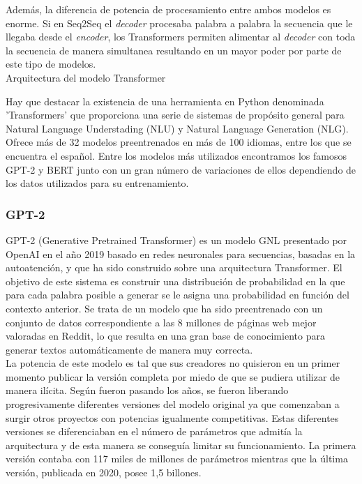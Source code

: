 Además, la diferencia de potencia de procesamiento entre ambos modelos es enorme. Si en Seq2Seq el \textit{decoder} procesaba palabra a palabra la secuencia que le llegaba desde el \textit{encoder}, los Transformers permiten alimentar al \textit{decoder} con toda la secuencia de manera simultanea resultando en un mayor poder por parte de este tipo de modelos.\\

%
{Arquitectura del modelo Transformer}

Hay que destacar la existencia de una herramienta en Python denominada 'Transformers' que proporciona una serie de sistemas de propósito general para Natural Language Understading (NLU) y Natural Language Generation (NLG). Ofrece más de 32 modelos preentrenados en más de 100 idiomas, entre los que se encuentra el español. Entre los modelos más utilizados encontramos los famosos GPT-2 y BERT junto con un gran número de variaciones de ellos dependiendo de los datos utilizados para su entrenamiento.\\

\subsubsection{GPT-2}
GPT-2 (Generative Pretrained Transformer) es un modelo GNL presentado por OpenAI en el año 2019 basado en redes neuronales para secuencias, basadas en la autoatención, y que ha sido construido sobre una arquitectura Transformer. El objetivo de este sistema es construir una distribución de probabilidad en la que para cada palabra posible a generar se le asigna una probabilidad en función del contexto anterior. Se trata de un modelo que ha sido preentrenado con un conjunto de datos correspondiente a las 8 millones de páginas web mejor valoradas en Reddit, lo que resulta en una gran base de conocimiento para generar textos automáticamente de manera muy correcta.\\

La potencia de este modelo es tal que sus creadores no quisieron en un primer momento publicar la versión completa por miedo de que se pudiera utilizar de manera ilícita. Según fueron pasando los años, se fueron liberando progresivamente diferentes versiones del modelo original ya que comenzaban a surgir otros proyectos con potencias igualmente competitivas. Estas diferentes versiones se diferenciaban en el número de parámetros que admitía la arquitectura y de esta manera se conseguía limitar su funcionamiento. La primera versión contaba con 117 miles de millones de parámetros mientras que la última versión, publicada en 2020, posee 1,5 billones.\\

